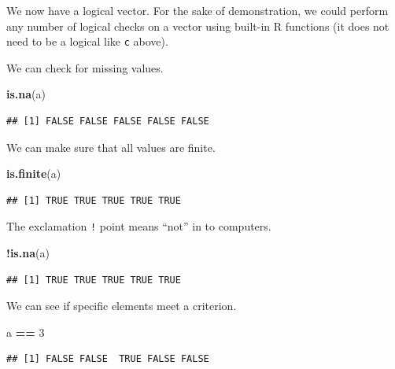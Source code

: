 \documentclass[
]{book}
\newenvironment{Shaded}{\begin{snugshade}}{\end{snugshade}}
\newcommand{\DecValTok}[1]{\textcolor[rgb]{0.00,0.00,0.81}{#1}}
\newcommand{\KeywordTok}[1]{\textcolor[rgb]{0.13,0.29,0.53}{\textbf{#1}}}
\newcommand{\NormalTok}[1]{#1}
\newcommand{\OperatorTok}[1]{\textcolor[rgb]{0.81,0.36,0.00}{\textbf{#1}}}
\newcommand{\StringTok}[1]{\textcolor[rgb]{0.31,0.60,0.02}{#1}}
\begin{document}
We now have a logical vector. For the sake of demonstration, we could perform any number of logical checks on a vector using built-in R functions (it does not need to be a logical like \texttt{c} above).

We can check for missing values.

\begin{Shaded}
\begin{Highlighting}[]
\KeywordTok{is.na}\NormalTok{(a)}
\end{Highlighting}
\end{Shaded}

\begin{verbatim}
## [1] FALSE FALSE FALSE FALSE FALSE
\end{verbatim}

We can make sure that all values are finite.

\begin{Shaded}
\begin{Highlighting}[]
\KeywordTok{is.finite}\NormalTok{(a)}
\end{Highlighting}
\end{Shaded}

\begin{verbatim}
## [1] TRUE TRUE TRUE TRUE TRUE
\end{verbatim}

The exclamation \texttt{!} point means ``not'' in to computers.

\begin{Shaded}
\begin{Highlighting}[]
\OperatorTok{!}\KeywordTok{is.na}\NormalTok{(a)}
\end{Highlighting}
\end{Shaded}

\begin{verbatim}
## [1] TRUE TRUE TRUE TRUE TRUE
\end{verbatim}

We can see if specific elements meet a criterion.

\begin{Shaded}
\begin{Highlighting}[]
\NormalTok{a }\OperatorTok{==}\StringTok{ }\DecValTok{3}
\end{Highlighting}
\end{Shaded}

\begin{verbatim}
## [1] FALSE FALSE  TRUE FALSE FALSE
\end{verbatim}
\end{document}
